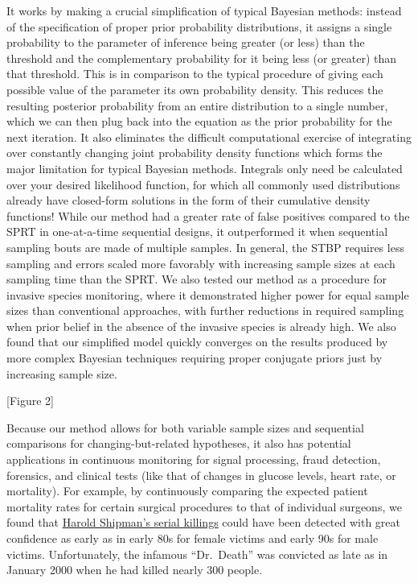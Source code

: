 \documentclass[
]{article}
\begin{document}
It works by making a crucial simplification of typical Bayesian methods:
instead of the specification of proper prior probability distributions,
it assigns a single probability to the parameter of inference being
greater (or less) than the threshold and the complementary probability
for it being less (or greater) than that threshold. This is in
comparison to the typical procedure of giving each possible value of the
parameter its own probability density. This reduces the resulting
posterior probability from an entire distribution to a single number,
which we can then plug back into the equation as the prior probability
for the next iteration. It also eliminates the difficult computational
exercise of integrating over constantly changing joint probability
density functions which forms the major limitation for typical Bayesian
methods. Integrals only need be calculated over your desired likelihood
function, for which all commonly used distributions already have
closed-form solutions in the form of their cumulative density functions!
While our method had a greater rate of false positives compared to the
SPRT in one-at-a-time sequential designs, it outperformed it when
sequential sampling bouts are made of multiple samples. In general, the
STBP requires less sampling and errors scaled more favorably with
increasing sample sizes at each sampling time than the SPRT. We also
tested our method as a procedure for invasive species monitoring, where
it demonstrated higher power for equal sample sizes than conventional
approaches, with further reductions in required sampling when prior
belief in the absence of the invasive species is already high. We also
found that our simplified model quickly converges on the results
produced by more complex Bayesian techniques requiring proper conjugate
priors just by increasing sample size.

{[}Figure 2{]}

Because our method allows for both variable sample sizes and sequential
comparisons for changing-but-related hypotheses, it also has potential
applications in continuous monitoring for signal processing, fraud
detection, forensics, and clinical tests (like that of changes in
glucose levels, heart rate, or mortality). For example, by continuously
comparing the expected patient mortality rates for certain surgical
procedures to that of individual surgeons, we found that
\href{https://en.wikipedia.org/wiki/Harold_Shipman}{Harold Shipman's
serial killings} could have been detected with great confidence as early
as in early 80s for female victims and early 90s for male victims.
Unfortunately, the infamous ``Dr.~Death'' was convicted as late as in
January 2000 when he had killed nearly 300 people.
\end{document}
